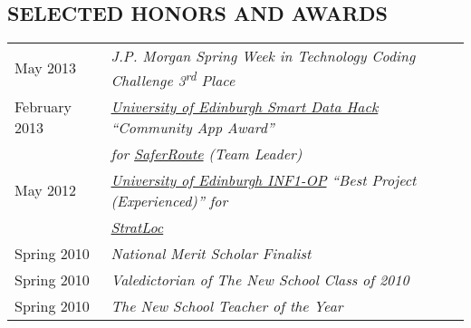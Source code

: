 \documentclass[line, margin]{res}
\newcommand{\ts}{\textsuperscript}
\begin{document}
\begin{resume}
\section{SELECTED HONORS AND AWARDS}
\begin{tabular}{@{}l l}
May 2013 & \textit{J.P. Morgan Spring Week in Technology Coding Challenge 3\ts{rd} Place}\linebreak \\[5pt]
February 2013 & \textit{\href{http://data.inf.ed.ac.uk/ilwhack/finalprojects.php}{University of Edinburgh Smart Data Hack} ``Community App Award''}\linebreak\\[1pt] 
&\textit{for \href{https://github.com/team-tusive/ilwhack}{SaferRoute} (Team Leader)} \linebreak \\[5pt]
May 2012 & \textit{\href{https://sites.google.com/site/2012oop/winners}{University of Edinburgh INF1-OP} ``Best Project (Experienced)'' for} \linebreak \\[1pt] 
 &\textit{\href{http://www.chasestevens.com/team2civ/}{StratLoc}} \linebreak \\[5pt]
Spring 2010 & \textit{National Merit Scholar Finalist} \\[5pt]
Spring 2010 & \textit{Valedictorian of The New School Class of 2010} \\[5pt]
Spring 2010 & \textit{The New School Teacher of the Year} \\[5pt]
\end{tabular}
\end{resume}
\end{document}
